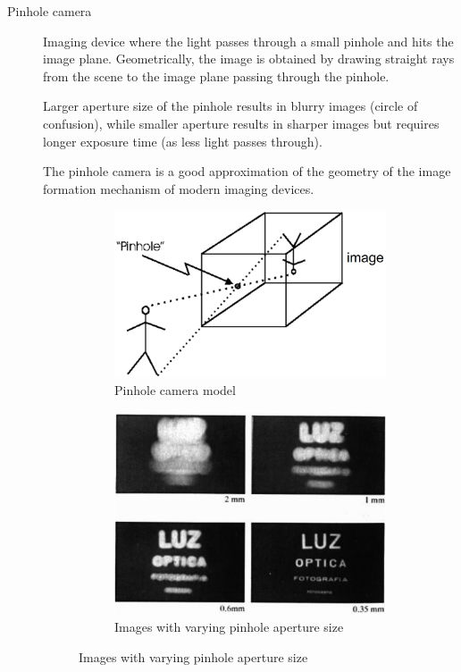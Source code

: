 \begin{description}
    \item[Pinhole camera] 
        Imaging device where the light passes through a small pinhole and hits the image plane.
        Geometrically, the image is obtained by drawing straight rays from the scene to the image plane passing through the pinhole.

        \begin{remark}
            Larger aperture size of the pinhole results in blurry images (circle of confusion), 
            while smaller aperture results in sharper images but requires longer exposure time (as less light passes through).
        \end{remark}

        \begin{remark}
            The pinhole camera is a good approximation of the geometry of the image formation mechanism of modern imaging devices.
        \end{remark}

        \begin{figure}[H]
            \begin{subfigure}{.4\textwidth}
                \centering
                \includegraphics[width=0.8\linewidth]{./img/pinhole.png}
                \caption{Pinhole camera model}
            \end{subfigure}
            \begin{subfigure}{.45\textwidth}
                \centering
                \includegraphics[width=0.7\linewidth]{./img/pinhole_hole_size.png}
                \caption{Images with varying pinhole aperture size}
            \end{subfigure}
        \end{figure}
\end{description}



